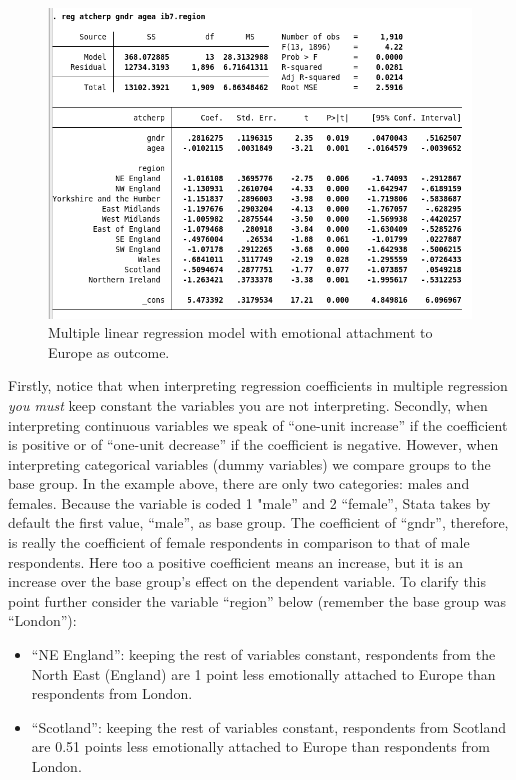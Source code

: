 \documentclass{article}
\begin{document}
\begin{figure}[H]
	\includegraphics[width=\linewidth]{../img/mult_reg2.png}
	\caption{Multiple linear regression model with emotional attachment to Europe as outcome.}
\end{figure}

Firstly, notice that when interpreting regression coefficients in multiple regression \textit{you must} keep constant the variables you are not interpreting. Secondly, when interpreting continuous variables we speak of ``one-unit increase'' if the coefficient is positive or of ``one-unit decrease'' if the coefficient is negative. However, when interpreting categorical variables (dummy variables) we compare groups to the base group. In the example above, there are only two categories: males and females. Because the variable is coded 1 "male'' and 2 ``female'', Stata takes by default the first value, ``male'', as base group. The coefficient of ``gndr'', therefore, is really the coefficient of female respondents in comparison to that of male respondents. Here too a positive coefficient means an increase, but it is an increase over the base group's effect on the dependent variable. To clarify this point further consider the variable ``region'' below (remember the base group was ``London''):

\begin{itemize}
	\item ``NE England'': keeping the rest of variables constant, respondents from the North East (England) are 1 point less emotionally attached to Europe than respondents from London.
	\item ``Scotland'': keeping the rest of variables constant, respondents from Scotland are 0.51 points less emotionally attached to Europe than respondents from London.
\end{itemize}
\end{document}
